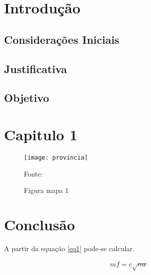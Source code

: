 \documentclass[]{politex}
\begin{document}

\chapter{Introdução}
\label{chapterIntroducao}
\blindtext
	
 \section{Considerações Iniciais}
	
	\blindtext
	
	\section{Justificativa}
	
	\blindtext
	
 \section{Objetivo}
	
	\blindtext
	
\chapter{Capitulo 1}
	
	\begin{figure}[H]
		\centering
		\texttt{[image: provincia]}
		\caption{Figura mapa 1} 
		Fonte: 
		\label{fig:mapacgg}
	\end{figure}
\chapter{Conclusão}
\begin{citacaoLonga}
	\blindtext[5]			 
\end{citacaoLonga}
	A partir da equação \ref{eq1} pode-se calcular.
	
		\begin{equation}
		\begin{aligned}
		mf=c\sqrt{mc}
		\end{aligned}
		\label{eq1}
		\end{equation}
		
		
		

	
\end{document}
